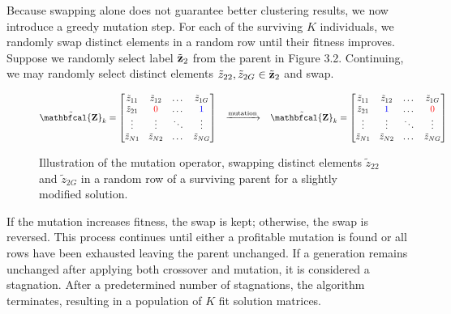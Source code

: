 \documentclass[12pt]{report}
\begin{document}
Because swapping alone does not guarantee better clustering results, we now introduce a greedy mutation step. For each of the surviving $K$ individuals, we randomly swap distinct elements in a random row until their fitness improves. Suppose we randomly select label $\tilde{\bf z}_2$ from the parent in Figure 3.2. Continuing, we may randomly select distinct elements $\tilde{z}_{22}, \tilde{z}_{2G} \in \tilde{\bf z}_2$ and swap. 
\vspace{0.5cm}
\begin{figure}[H]
$$\tilde{ {\bf \mathbfcal{Z}} }_{k}  = 
\begin{bmatrix}
    \tilde{z}_{11} & \tilde{z}_{12} & \dots & \tilde{z}_{1G} \\
    \tilde{z}_{21} & \textcolor{red}{0} & \dots & \textcolor{blue}{1} \\
    \vdots & \vdots & \ddots & \vdots \\
    \tilde{z}_{N1}& \tilde{z}_{N2}& \dots & \tilde{z}_{NG}\\
\end{bmatrix} 
\;
\;
\;
\xrightarrow{\text{mutation}}
\;
\;
\;
\tilde{ {\bf \mathbfcal{Z}} }_{k} = 
\begin{bmatrix}
    \tilde{z}_{11} & \tilde{z}_{12} & \dots & \tilde{z}_{1G} \\
    \tilde{z}_{21} & \textcolor{blue}{1} & \dots & \textcolor{red}{0} \\
    \vdots & \vdots & \ddots & \vdots \\
    \tilde{z}_{N1}& \tilde{z}_{N2}& \dots & \tilde{z}_{NG}\\
\end{bmatrix}$$
\vspace{-0.5cm}
\caption{Illustration of the mutation operator, swapping distinct elements $\tilde{z}_{22}$ and $\tilde{z}_{2G}$ in a random row of a surviving parent for a slightly modified solution.}
\end{figure}

If the mutation increases fitness, the swap is kept; otherwise, the swap is reversed. This process continues until either a profitable mutation is found or all rows have been exhausted leaving the parent unchanged. If a generation remains unchanged after applying both crossover and mutation, it is considered a stagnation. After a predetermined number of stagnations, the algorithm terminates, resulting in a population of $K$ fit solution matrices.
\end{document}
